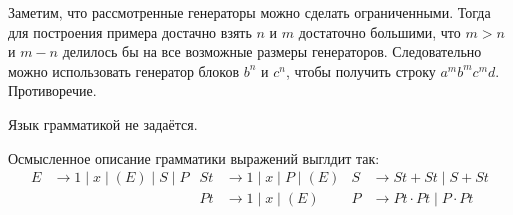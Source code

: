 \documentclass[12pt,a4paper]{article}
\begin{document}
\begin{problem}{5}
        
        Заметим, что рассмотренные генераторы можно сделать ограниченными. Тогда для построения примера достачно взять $n$ и $m$ достаточно большими, что $m > n$ и $m-n$ делилось бы на все возможные размеры генераторов. Следовательно можно использовать генератор блоков $b^n$ и $c^n$, чтобы получить строку $a^m b^m c^m d$. Противоречие.
        
        Язык грамматикой не задаётся.
    \end{problem}

    \begin{problem}{6}
        Осмысленное описание грамматики выражений выглдит так:
        \begin{align*}
            E &\to 1 \mid x \mid (E) \mid S \mid P&
            St &\to 1 \mid x \mid P \mid (E)&
            S &\to St + St \mid S + St\\
            &&
            Pt &\to 1 \mid x \mid (E)&
            P &\to Pt \cdot Pt \mid P \cdot Pt
        \end{align*}
    \end{problem}
\end{document}
